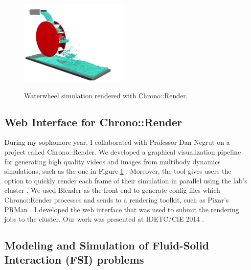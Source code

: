 \documentclass{article}
\theoremstyle{definition}
\begin{document}
\begin{figure}
    \vspace{-23pt}

  \begin{center}
    \includegraphics[width=0.48\textwidth, height=5cm]{waterwheel.png}
  \end{center}
   \vspace{-15pt}

  \caption{Waterwheel simulation rendered with Chrono::Render.}\label{Fig:foam}
   \vspace{-5pt}

\end{figure}

\subsection*{Web Interface for Chrono::Render}
During my sophomore year, I collaborated with Professor Dan Negrut on a project called Chrono::Render. We developed a graphical visualization pipeline for generating high quality videos and images from multibody dynamics simulations, such as the one in Figure \ref{Fig:foam} \cite{chronoRender}. Moreover, the tool gives users the option to quickly render each frame of their simulation in parallel using the lab's cluster \cite{eulerCluster}. We used Blender \cite{blender1, blender2} as the front-end to generate config files which Chrono::Render processes and sends to a rendering toolkit, such as Pixar's PRMan \cite{prman}. I developed the web interface that was used to submit the rendering jobs to the cluster. Our work was presented at IDETC/CIE 2014 \cite{chronoRender}. 

\newpage



\subsection*{Modeling and Simulation of Fluid-Solid Interaction (FSI) problems}
\end{document}
